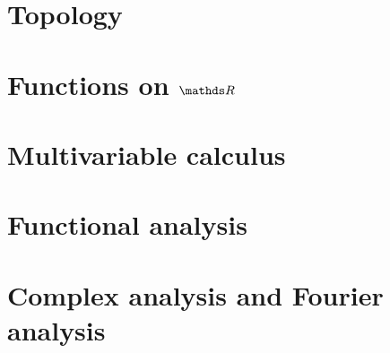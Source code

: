 \documentclass{article}
\begin{document}
\section{Topology}

\section{Functions on $\R$}

\section{Multivariable calculus}

\section{Functional analysis}

\section{Complex analysis and Fourier analysis}
\end{document}

